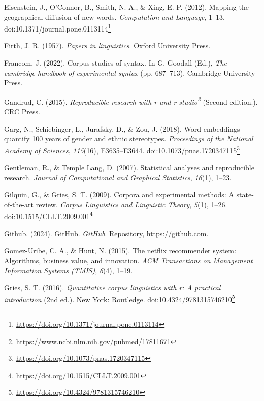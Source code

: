 \documentclass[
  letterpaper,
]{book}
\newlength{\cslhangindent}
\newenvironment{CSLReferences}[2] %
 {\begin{list}{}{%
  \setlength{\itemindent}{0pt}
  \setlength{\leftmargin}{0pt}
  \setlength{\parsep}{0pt}
  \ifodd #1
   \setlength{\leftmargin}{\cslhangindent}
   \setlength{\itemindent}{-1\cslhangindent}
  \fi
  \setlength{\itemsep}{#2\baselineskip}}}
 {\end{list}}
\theoremstyle{definition}
\theoremstyle{remark}
\DeclareRobustCommand{\href}[2]{#2\footnote{\url{#1}}}
\begin{document}
\begin{CSLReferences}{1}{0}
Eisenstein, J., O'Connor, B., Smith, N. A., \& Xing, E. P. (2012).
Mapping the geographical diffusion of new words. \emph{Computation and
Language}, 1--13.
doi:\href{https://doi.org/10.1371/journal.pone.0113114}{10.1371/journal.pone.0113114}

Firth, J. R. (1957). \emph{Papers in linguistics}. Oxford University
Press.

Francom, J. (2022). Corpus studies of syntax. In G. Goodall (Ed.),
\emph{The cambridge handbook of experimental syntax} (pp. 687--713).
Cambridge University Press.

Gandrud, C. (2015).
\emph{\href{https://www.ncbi.nlm.nih.gov/pubmed/17811671}{Reproducible
research with r and r studio}} (Second edition.). CRC Press.

Garg, N., Schiebinger, L., Jurafsky, D., \& Zou, J. (2018). Word
embeddings quantify 100 years of gender and ethnic stereotypes.
\emph{Proceedings of the National Academy of Sciences}, \emph{115}(16),
E3635--E3644.
doi:\href{https://doi.org/10.1073/pnas.1720347115}{10.1073/pnas.1720347115}

Gentleman, R., \& Temple Lang, D. (2007). Statistical analyses and
reproducible research. \emph{Journal of Computational and Graphical
Statistics}, \emph{16}(1), 1--23.

Gilquin, G., \& Gries, S. T. (2009). Corpora and experimental methods: A
state-of-the-art review. \emph{Corpus Linguistics and Linguistic
Theory}, \emph{5}(1), 1--26.
doi:\href{https://doi.org/10.1515/CLLT.2009.001}{10.1515/CLLT.2009.001}

Github. (2024). GitHub. \emph{GitHub}. Repository, https://github.com.

Gomez-Uribe, C. A., \& Hunt, N. (2015). The netflix recommender system:
Algorithms, business value, and innovation. \emph{ACM Transactions on
Management Information Systems (TMIS)}, \emph{6}(4), 1--19.

Gries, S. T. (2016). \emph{Quantitative corpus linguistics with r: A
practical introduction} (2nd ed.). New York: Routledge.
doi:\href{https://doi.org/10.4324/9781315746210}{10.4324/9781315746210}


\end{CSLReferences}
\end{document}

